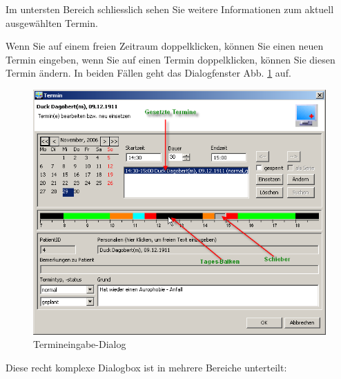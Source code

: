 Im untersten Bereich schliesslich sehen Sie weitere Informationen zum aktuell ausgewählten Termin.

\bigskip

Wenn Sie auf einem freien Zeitraum doppelklicken, können Sie einen neuen Termin eingeben, wenn Sie auf einen Termin doppelklicken,
können Sie diesen Termin ändern. In beiden Fällen geht das Dialogfenster Abb. \ref{fig:termineingabe} auf.

\begin{figure}
\includegraphics[width=5in]{images/use4.png}
\caption{Termineingabe-Dialog}\label{fig:termineingabe}
\end{figure}
Diese recht komplexe Dialogbox ist in mehrere Bereiche unterteilt:

